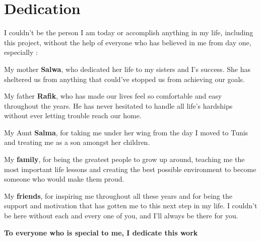 \chapter*{Dedication}

I couldn't be the person I am today or accomplish anything in my life, including this project, without the help of everyone who has believed in me from day one, especially :\newline


My mother \textbf{Salwa}, who dedicated her life to my sisters and I's success. She has sheltered us from anything that could've stopped us from achieving our goals.\newline

My father \textbf{Rafik},  who has made our lives feel so comfortable and easy throughout the years. He has never hesitated to handle all life's hardships without ever letting trouble reach our home.\newline

My Aunt \textbf{Salma}, for taking me under her wing from the day I moved to Tunis and treating me as a son amongst her children.\newline

My \textbf{family}, for being the greatest people to grow up around, teaching me the most important life lessons and creating the best possible environment to become someone who would make them proud.\newline

My \textbf{friends}, for inspiring me throughout all these years and for being the support and motivation that has gotten me to this next step in my life. I couldn't be here without each and every one of you, and I'll always be there for you.\newline

\begin{center}
	\textbf{To everyone who is special to me, I dedicate this work}
\end{center}
